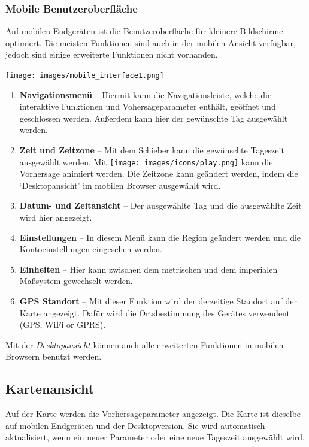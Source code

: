 \documentclass[11pt,a4paper]{article}
\begin{document}
\subsubsection{Mobile Benutzeroberfläche}
Auf mobilen Endgeräten ist die Benutzeroberfläche für kleinere Bildschirme optimiert. Die meisten Funktionen sind auch in der mobilen Ansicht verfügbar, jedoch sind einige erweiterte Funktionen nicht vorhanden.
\begin{center}
\texttt{[image: images/mobile\_interface1.png]}
\end{center}
\begin{enumerate}
\item \textbf{Navigationsmenü} -- Hiermit kann die Navigationsleiste, welche die interaktive Funktionen und Vohersageparameter enthält, geöffnet und geschlossen werden. Außerdem kann hier der gewünschte Tag ausgewählt werden.
\item \textbf{Zeit und Zeitzone} -- Mit dem Schieber kann die gewünschte Tageszeit ausgewählt werden. Mit \texttt{[image: images/icons/play.png]} kann die Vorhersage animiert werden. Die Zeitzone kann geändert werden, indem die `Desktopansicht' im mobilen Browser ausgewählt wird.
\item \textbf{Datum- und Zeitansicht} -- Der ausgewählte Tag und die ausgewählte Zeit wird hier angezeigt.
\item \textbf{Einstellungen} -- In diesem Menü kann die Region geändert werden und die Kontoeinstellungen eingesehen werden.
\item \textbf{Einheiten} -- Hier kann zwischen dem metrischen und dem imperialen Maßsystem gewechselt werden.
\item \textbf{GPS Standort} -- Mit dieser Funktion wird der derzeitige Standort auf der Karte angezeigt. Dafür wird die Ortsbestimmung des Gerätes verwendent (GPS, WiFi or GPRS).
\end{enumerate}

\begin{tip}
\item Mit der \emph{Desktopansicht} können auch alle erweiterten Funktionen in mobilen Browsern benutzt werden.
\end{tip}
\subsection{Kartenansicht} \label{subsec:mapnav}
Auf der Karte werden die Vorhersageparameter angezeigt. Die Karte ist dieselbe auf mobilen Endgeräten und der Desktopversion. Sie wird automatisch aktualisiert, wenn ein neuer Parameter oder eine neue Tageszeit ausgewählt wird.
\end{document}
